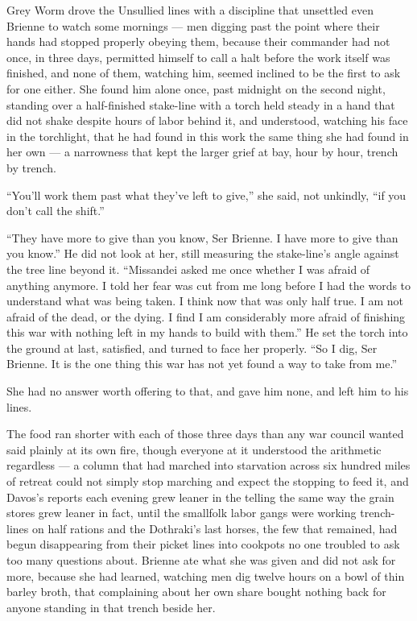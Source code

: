 \sceneBreak

Grey Worm drove the Unsullied lines with a discipline that unsettled even Brienne to watch some mornings — men digging past the point where their hands had stopped properly obeying them, because their commander had not once, in three days, permitted himself to call a halt before the work itself was finished, and none of them, watching him, seemed inclined to be the first to ask for one either. She found him alone once, past midnight on the second night, standing over a half-finished stake-line with a torch held steady in a hand that did not shake despite hours of labor behind it, and understood, watching his face in the torchlight, that he had found in this work the same thing she had found in her own — a narrowness that kept the larger grief at bay, hour by hour, trench by trench.

“You’ll work them past what they’ve left to give,” she said, not unkindly, “if you don’t call the shift.”

“They have more to give than you know, Ser Brienne. I have more to give than you know.” He did not look at her, still measuring the stake-line’s angle against the tree line beyond it. “Missandei asked me once whether I was afraid of anything anymore. I told her fear was cut from me long before I had the words to understand what was being taken. I think now that was only half true. I am not afraid of the dead, or the dying. I find I am considerably more afraid of finishing this war with nothing left in my hands to build with them.” He set the torch into the ground at last, satisfied, and turned to face her properly. “So I dig, Ser Brienne. It is the one thing this war has not yet found a way to take from me.”

She had no answer worth offering to that, and gave him none, and left him to his lines.

The food ran shorter with each of those three days than any war council wanted said plainly at its own fire, though everyone at it understood the arithmetic regardless — a column that had marched into starvation across six hundred miles of retreat could not simply stop marching and expect the stopping to feed it, and Davos’s reports each evening grew leaner in the telling the same way the grain stores grew leaner in fact, until the smallfolk labor gangs were working trench-lines on half rations and the Dothraki’s last horses, the few that remained, had begun disappearing from their picket lines into cookpots no one troubled to ask too many questions about. Brienne ate what she was given and did not ask for more, because she had learned, watching men dig twelve hours on a bowl of thin barley broth, that complaining about her own share bought nothing back for anyone standing in that trench beside her.

